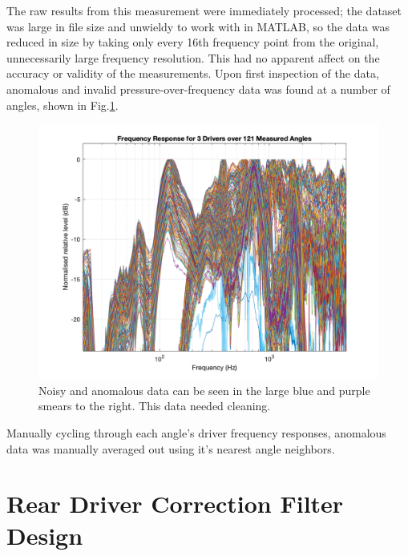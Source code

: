 \documentclass{report}
\begin{document}
        The raw results from this measurement were immediately processed; the dataset was large in file size and unwieldy to work with in MATLAB, so the data was reduced in size by taking only every 16th frequency point from the original, unnecessarily large frequency resolution.
        This had no apparent affect on the accuracy or validity of the measurements.
        Upon first inspection of the data, anomalous and invalid pressure-over-frequency data was found at a number of angles, shown in Fig.\ref{allAngles}.
        \begin{figure}[H]
            \centering
            \includegraphics[scale=0.35]{figs/allAngles.png}%
            \caption{Noisy and anomalous data can be seen in the large blue and purple smears to the right. This data needed cleaning.}
            \label{allAngles}
        \end{figure}
        Manually cycling through each angle's driver frequency responses, anomalous data was manually averaged out using it's nearest angle neighbors.



    
    \section{Rear Driver Correction Filter Design}
\end{document}
